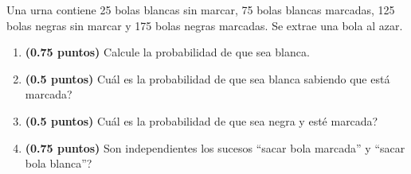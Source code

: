 
Una urna contiene 25 bolas blancas sin marcar, 75 bolas blancas marcadas, 125 bolas negras sin marcar y 175 bolas negras marcadas. Se extrae una bola al azar.
\begin{enumerate}[label=\alph*)]
\item \textbf{(0.75 puntos)} Calcule la probabilidad de que sea blanca.
\item \textbf{(0.5 puntos)} \textquestiondown{}Cuál es la probabilidad de que sea blanca sabiendo que está marcada?
\item \textbf{(0.5 puntos)} \textquestiondown{}Cuál es la probabilidad de que sea negra y esté marcada?
\item \textbf{(0.75 puntos)} \textquestiondown{}Son independientes los sucesos ``sacar bola marcada'' y ``sacar bola blanca''?
\end{enumerate}
